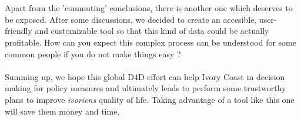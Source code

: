 \\
\\
Apart from the 'commuting' conclusions, there is another one which deserves to be exposed. After some discussions, we decided to create an accesible, user-friendly and customizable tool so that this kind of data could be actually profitable. How can you expect this complex process can be understood for some common people if you do not make things easy ?
\\
\\
Summing up, we hope this global D4D effort can help Ivory Coast in decision making for policy measures and ultimately leads to perform some trustworthy plans to improve {\it ivoriens} quality of life. Taking advantage of a tool like this one will save them money and time.
\\
\\